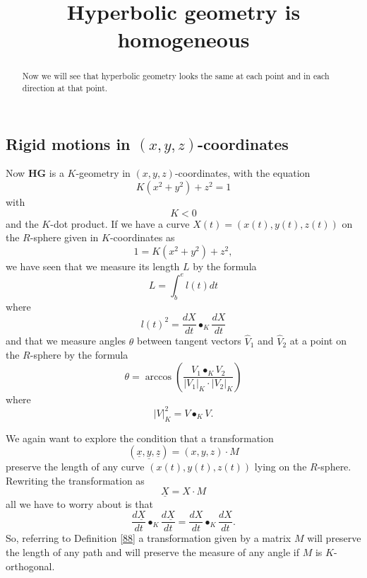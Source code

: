 \documentclass{ximera}
\title{Hyperbolic geometry is homogeneous}
\begin{document}
\begin{abstract}
Now we will see that hyperbolic geometry looks the same at each point
and in each direction at that point.
\end{abstract}
\maketitle


\subsection*{Rigid motions in $\left(  x,y,z\right)  $-coordinates}

Now \textbf{HG} is a $K$-geometry in $\left( x,y,z\right) $-coordinates, with the equation
\begin{equation}
K\left(  x^{2}+y^{2}\right)  +z^{2}=1 \label{83}%
\end{equation}
with%
\[
K<0
\]
and the $K$-dot product. If we have a curve $X\left( t\right) =\left(
x\left( t\right) ,y\left( t\right) ,z\left( t\right) \right) $ on the
$R$-sphere given in $K$-coordinates as%
\[
1=K\left(  x^{2}+y^{2}\right)  +z^{2},
\]
we have seen that we measure its length $L$ by the formula%
\begin{equation}
L=%
{\displaystyle\int\nolimits_{b}^{e}}
l\left(  t\right)  dt \label{84}%
\end{equation}
where
\begin{equation}
l\left(  t\right)  ^{2}=\frac{dX}{dt}\bullet_{K}\frac{dX}{dt} \label{85}%
\end{equation}
and that we measure angles $\theta$ between tangent vectors
$\hat{V}_{1}$ and $\hat{V}_{2}$ at a point on the $R$-sphere by the
formula%
\[
\theta=\arccos \left(  \frac{V_{1}\bullet_{K}V_{2}}{\left\vert
V_{1}\right\vert _{K}\cdot\left\vert V_{2}\right\vert
_{K}}\right)
\]
where%
\[
\left\vert V\right\vert _{K}^{2}=V\bullet_{K}V.
\]


We again want to explore the condition that a transformation%
\[
\left(  \underline{x},\underline{y},\underline{z}\right)  =\left(
x,y,z\right)  \cdot M
\]
preserve the length of any curve $\left( x\left( t\right) ,y\left(
t\right) ,z\left( t\right) \right) $ lying on the
$R$-sphere. Rewriting the transformation as%
\[
\underline{X}=X\cdot M
\]
all we have to worry about is that%
\[
\frac{d\underline{X}}{dt}\bullet_{K}\frac{d\underline{X}}{dt}=\frac{dX}%
{dt}\bullet_{K}\frac{dX}{dt}.
\]
So, referring to Definition \ref{88} a transformation given by a
matrix $M$ will preserve the length of any path and will preserve the
measure of any angle if $M$ is $K$-orthogonal.
\end{document}
